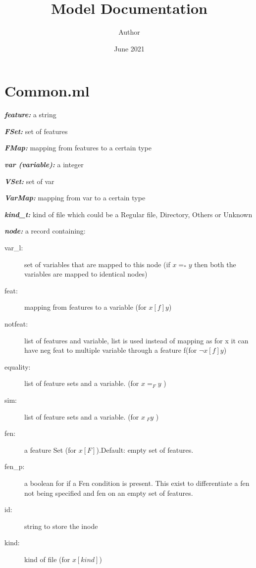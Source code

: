 \documentclass[12pt]{article}
\title{Model Documentation}
\author{Author}
\date{June 2021}
\begin{document}
\maketitle
\tableofcontents
\newpage
\section{Common.ml}

\begin{description}
\item \textbf{\textit{feature:}} a string
\item \textbf{\textit{FSet:}} set of features
\item \textbf{\textit{FMap:}} mapping from features to a certain type
\item \textbf{\textit{var (variable):}} a integer
\item \textbf{\textit{VSet:}} set of var
\item \textbf{\textit{VarMap:}} mapping from var to a certain type
\item \textbf{\textit{kind\_t:}} kind of file which could be a Regular file, Directory, Others or Unknown
\item \textbf{\textit{node:}} a record containing:
    \begin{description}
    \item [var\_l:] set of variables that are mapped to this node (if $x =_* y$ then both the variables are mapped to identical nodes)
    \item [feat:] mapping from features to a variable (for $x[f]y$)
    \item [notfeat:] list of features and variable, list is used instead of mapping as for x it can have neg feat to multiple variable through a feature f(for $\lnot x[f]y$)
    \item [equality:] list of feature sets and a variable. (for $x =_F y$ )
    \item [sim:] list of feature sets and a variable. (for $x ~_F y$ )
    \item [fen:] a feature Set (for $x[F]$).Default: empty set of features.
    \item [fen\_p:] a boolean for if a Fen condition is present. This exist to differentiate a fen not being specified and fen on an empty set of features.
    \item [id:] string to store the inode 
    \item [kind:] kind of file (for $x[kind]$)
    \end{description}


\end{description}
\end{document}

